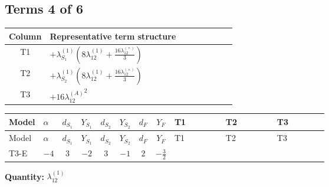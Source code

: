 \documentclass[8pt]{article}
\begin{document}
\begin{landscape}
\subsection*{Terms 4 of 6}
\begin{center}
\begin{tabular}{@{}c >{\raggedright\arraybackslash}p{0.82\linewidth}@{}}
\toprule
Column & Representative term structure \\
\midrule
T1 & \(\displaystyle +{\lambda_{S_1}^{(1)}} \left(8 {\lambda_{12}^{(1)}}+\frac{16 {\lambda_{12}^{(\times)}}}{3}\right)\) \\
\midrule
T2 & \(\displaystyle +{\lambda_{S_2}^{(1)}} \left(8 {\lambda_{12}^{(1)}}+\frac{16 {\lambda_{12}^{(\times)}}}{3}\right)\) \\
\midrule
T3 & \(\displaystyle +16 {\lambda_{12}^{(A)}}^2\) \\
\midrule
\bottomrule
\end{tabular}
\end{center}
\smallskip
\tiny
\begin{longtable}{@{}llcccccc >{\raggedright\arraybackslash}p{0.21\linewidth} >{\raggedright\arraybackslash}p{0.21\linewidth} >{\raggedright\arraybackslash}p{0.21\linewidth}@{}}
\toprule
Model & $\alpha$ & $d_{S_1}$ & $Y_{S_1}$ & $d_{S_2}$ & $Y_{S_2}$ & $d_F$ & $Y_F$ & T1 & T2 & T3 \\
\midrule
\endfirsthead
\toprule
Model & $\alpha$ & $d_{S_1}$ & $Y_{S_1}$ & $d_{S_2}$ & $Y_{S_2}$ & $d_F$ & $Y_F$ & T1 & T2 & T3 \\
\midrule
\endhead
T3-E & $-4$ & $3$ & $-2$ & $3$ & $-1$ & $2$ & $-\frac{3}{2}$ & \scriptsize\adjustbox{max width=\linewidth}{$\begin{gathered} +{\lambda_{S_1}^{(1)}} \left(8 {\lambda_{12}^{(1)}}+\frac{16 {\lambda_{12}^{(\times)}}}{3}\right)\end{gathered}$} & \scriptsize\adjustbox{max width=\linewidth}{$\begin{gathered} +{\lambda_{S_2}^{(1)}} \left(8 {\lambda_{12}^{(1)}}+\frac{16 {\lambda_{12}^{(\times)}}}{3}\right)\end{gathered}$} & \scriptsize\adjustbox{max width=\linewidth}{$\begin{gathered} +16 {\lambda_{12}^{(A)}}^2\end{gathered}$} \\
\midrule
\bottomrule
\end{longtable}
\clearpage
\noindent\textbf{Quantity: }$\lambda_{12}^{(1)}$\par\smallskip

\end{landscape}
\end{document}

